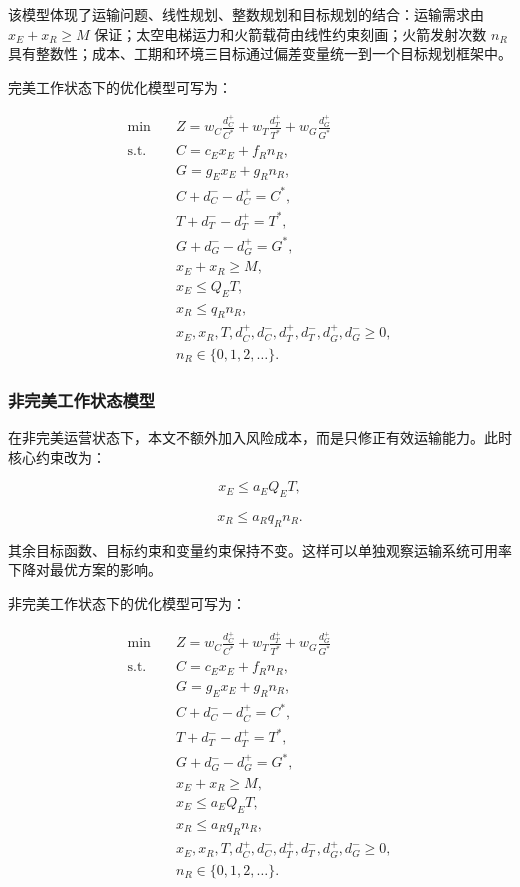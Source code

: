 \documentclass[12pt,a4paper,UTF8]{article}
\begin{document}
该模型体现了运输问题、线性规划、整数规划和目标规划的结合：运输需求由 \(x_E+x_R\ge M\) 保证；太空电梯运力和火箭载荷由线性约束刻画；火箭发射次数 \(n_R\) 具有整数性；成本、工期和环境三目标通过偏差变量统一到一个目标规划框架中。

完美工作状态下的优化模型可写为：

\[
\begin{aligned}
\min \quad
& Z=w_C\frac{d_C^+}{C^*}+w_T\frac{d_T^+}{T^*}+w_G\frac{d_G^+}{G^*} \\
\text{s.t.}\quad
& C=c_Ex_E+f_Rn_R, \\
& G=g_Ex_E+g_Rn_R, \\
& C+d_C^- - d_C^+=C^*, \\
& T+d_T^- - d_T^+=T^*, \\
& G+d_G^- - d_G^+=G^*, \\
& x_E+x_R\ge M, \\
& x_E\le Q_ET, \\
& x_R\le q_Rn_R, \\
& x_E,x_R,T,d_C^+,d_C^-,d_T^+,d_T^-,d_G^+,d_G^-\ge0, \\
& n_R\in\{0,1,2,\ldots\}.
\end{aligned}
\]

\subsubsection{非完美工作状态模型}

在非完美运营状态下，本文不额外加入风险成本，而是只修正有效运输能力。此时核心约束改为：

\[
x_E\le a_EQ_ET,
\]

\[
x_R\le a_Rq_Rn_R.
\]

其余目标函数、目标约束和变量约束保持不变。这样可以单独观察运输系统可用率下降对最优方案的影响。

非完美工作状态下的优化模型可写为：

\[
\begin{aligned}
\min \quad
& Z=w_C\frac{d_C^+}{C^*}+w_T\frac{d_T^+}{T^*}+w_G\frac{d_G^+}{G^*} \\
\text{s.t.}\quad
& C=c_Ex_E+f_Rn_R, \\
& G=g_Ex_E+g_Rn_R, \\
& C+d_C^- - d_C^+=C^*, \\
& T+d_T^- - d_T^+=T^*, \\
& G+d_G^- - d_G^+=G^*, \\
& x_E+x_R\ge M, \\
& x_E\le a_EQ_ET, \\
& x_R\le a_Rq_Rn_R, \\
& x_E,x_R,T,d_C^+,d_C^-,d_T^+,d_T^-,d_G^+,d_G^-\ge0, \\
& n_R\in\{0,1,2,\ldots\}.
\end{aligned}
\]
\end{document}

